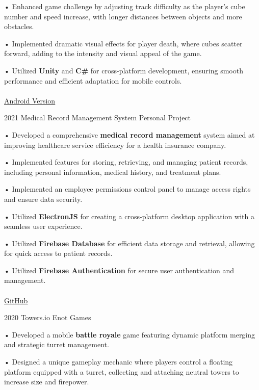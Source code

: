 \documentclass[9pt]{developercv} %
\begin{document}
\begin{entrylist}
{        • Enhanced game challenge by adjusting track difficulty as the player's cube number and speed increase, with longer distances between objects and more obstacles.

        • Implemented dramatic visual effects for player death, where cubes scatter forward, adding to the intensity and visual appeal of the game.

        • Utilized \textbf{Unity} and \textbf{C\#} for cross-platform development, ensuring smooth performance and efficient adaptation for mobile controls.
        \\
        \\
        \href{https://apkpure.com/ru/2048-miles-per-hour/com.lazredgame.MilesperHour2048}{\uline{Android Version}}
        \\
    }
    \entry
    {2021}
    {Medical Record Management System}
    {Personal Project}
    {

    • Developed a comprehensive \textbf{medical record management} system aimed at improving healthcare service efficiency for a health insurance company.

    • Implemented features for storing, retrieving, and managing patient records, including personal information, medical history, and treatment plans.

    • Implemented an employee permissions control panel to manage access rights and ensure data security.

    • Utilized \textbf{ElectronJS} for creating a cross-platform desktop application with a seamless user experience.

    • Utilized \textbf{Firebase Database} for efficient data storage and retrieval, allowing for quick access to patient records.

    • Utilized \textbf{Firebase Authentication} for secure user authentication and management.
    \\
    \\
    {\href{https://github.com/ekrem-qb/Medicline}{\uline{GitHub}}}
    \\
    }
    \entry
    {2020}
    {Towers.io}
    {Enot Games}
    {

        • Developed a mobile \textbf{battle royale} game featuring dynamic platform merging and strategic turret management.

        • Designed a unique gameplay mechanic where players control a floating platform equipped with a turret, collecting and attaching neutral towers to increase size and firepower.

}
\end{entrylist}
\end{document}
